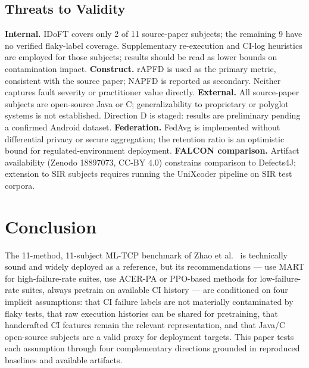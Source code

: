 \documentclass[conference]{IEEEtran}
\begin{document}
\subsection{Threats to Validity}

\textbf{Internal.} IDoFT covers only 2 of 11 source-paper subjects; the remaining 9 have no verified flaky-label coverage. Supplementary re-execution and CI-log heuristics are employed for those subjects; results should be read as lower bounds on contamination impact. \textbf{Construct.} rAPFD is used as the primary metric, consistent with the source paper; NAPFD is reported as secondary. Neither captures fault severity or practitioner value directly. \textbf{External.} All source-paper subjects are open-source Java or C; generalizability to proprietary or polyglot systems is not established. Direction D is staged: results are preliminary pending a confirmed Android dataset. \textbf{Federation.} FedAvg is implemented without differential privacy or secure aggregation; the retention ratio is an optimistic bound for regulated-environment deployment. \textbf{FALCON comparison.} Artifact availability (Zenodo 18897073, CC-BY 4.0) constrains comparison to Defects4J; extension to SIR subjects requires running the UniXcoder pipeline on SIR test corpora.




\section{Conclusion}

The 11-method, 11-subject ML-TCP benchmark of Zhao et al.~\cite{zhao2023} is technically sound and widely deployed as a reference, but its recommendations --- use MART for high-failure-rate suites, use ACER-PA or PPO-based methods for low-failure-rate suites, always pretrain on available CI history --- are conditioned on four implicit assumptions: that CI failure labels are not materially contaminated by flaky tests, that raw execution histories can be shared for pretraining, that handcrafted CI features remain the relevant representation, and that Java/C open-source subjects are a valid proxy for deployment targets. This paper tests each assumption through four complementary directions grounded in reproduced baselines and available artifacts.
\end{document}
